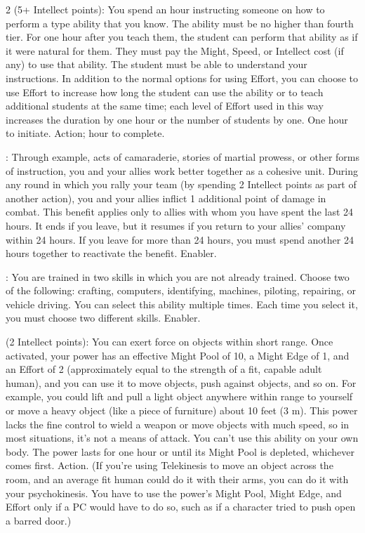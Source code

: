 \begin{multicols}{2}
 (5+ Intellect points): You spend an hour instructing someone on how to perform a type ability that you know. The ability must be no higher than fourth tier. For one hour after you teach them, the student can perform that ability as if it were natural for them. They must pay the Might, Speed, or Intellect cost (if any) to use that ability. The student must be able to understand your instructions. In addition to the normal options for using Effort, you can choose to use Effort to increase how long the student can use the ability or to teach additional students at the same time; each level of Effort used in this way increases the duration by one hour or the number of students by one. One hour to initiate. Action; hour to complete. 
 
: Through example, acts of camaraderie, stories of martial prowess, or other forms of instruction, you and your allies work better together as a cohesive unit. During any round in which you rally your team (by spending 2 Intellect points as part of another action), you and your allies inflict 1 additional point of damage in combat. This benefit applies only to allies with whom you have spent the last 24 hours. It ends if you leave, but it resumes if you return to your allies’ company within 24 hours. If you leave for more than 24 hours, you must spend another 24 hours together to reactivate the benefit. Enabler. 
 
: You are trained in two skills in which you are not already trained. Choose two of the following: crafting, computers, identifying, machines, piloting, repairing, or vehicle driving. You can select this ability multiple times. Each time you select it, you must choose two different skills. Enabler. 
 
 (2 Intellect points): You can exert force on objects within short range. Once activated, your power has an effective Might Pool of 10, a Might Edge of 1, and an Effort of 2 (approximately equal to the strength of a fit, capable adult human), and you can use it to move objects, push against objects, and so on. For example, you could lift and pull a light object anywhere within range to yourself or move a heavy object (like a piece of furniture) about 10 feet (3 m). This power lacks the fine control to wield a weapon or move objects with much speed, so in most situations, it’s not a means of attack. You can’t use this ability on your own body. The power lasts for one hour or until its Might Pool is depleted, whichever comes first. Action. (If you’re using Telekinesis to move an object across the room, and an average fit human could do it with their arms, you can do it with your psychokinesis. You have to use the power’s Might Pool, Might Edge, and Effort only if a PC would have to do so, such as if a character tried to push open a barred door.)
 

\end{multicols}
